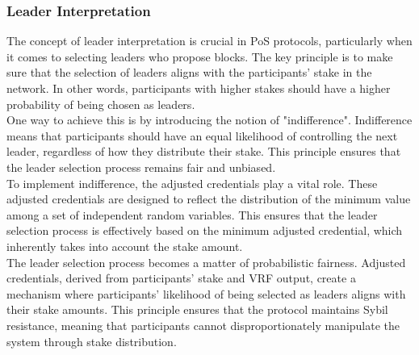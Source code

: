 \subsubsection{Leader Interpretation}
The concept of leader interpretation is crucial in PoS protocols, particularly when it comes to selecting leaders who propose blocks. The key principle is to make sure that the selection of leaders aligns with the participants' stake in the network. In other words, participants with higher stakes should have a higher probability of being chosen as leaders.\\
One way to achieve this is by introducing the notion of "indifference". Indifference means that participants should have an equal likelihood of controlling the next leader, regardless of how they distribute their stake. This principle ensures that the leader selection process remains fair and unbiased.\\
To implement indifference, the adjusted credentials play a vital role. These adjusted credentials are designed to reflect the distribution of the minimum value among a set of independent random variables. This ensures that the leader selection process is effectively based on the minimum adjusted credential, which inherently takes into account the stake amount.\\
The leader selection process becomes a matter of probabilistic fairness. Adjusted credentials, derived from participants' stake and VRF output, create a mechanism where participants' likelihood of being selected as leaders aligns with their stake amounts. This principle ensures that the protocol maintains Sybil resistance, meaning that participants cannot disproportionately manipulate the system through stake distribution.


